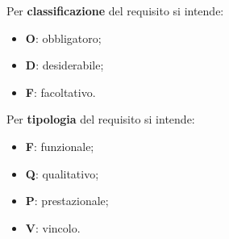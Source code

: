 Per \textbf{classificazione} del requisito si intende:
\begin{itemize}
    \item \textbf{O}: obbligatoro;
    \item \textbf{D}: desiderabile;
    \item \textbf{F}: facoltativo.
\end{itemize}

Per \textbf{tipologia} del requisito si intende:
\begin{itemize}
    \item \textbf{F}: funzionale;
    \item \textbf{Q}: qualitativo;
    \item \textbf{P}: prestazionale;
    \item \textbf{V}: vincolo.
\end{itemize}

